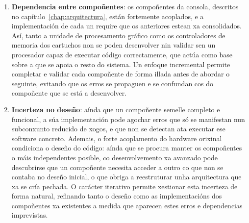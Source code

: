 \begin{enumerate}
    \item \textbf{Dependencia entre compoñentes}:
    os compoñentes da consola, descritos no capítulo~\ref{chap:arquitectura},
    están fortemente acoplados, e a implementación de cada un
    require que os anteriores estean xa consolidados.
    Así, tanto a unidade de procesamento gráfico como os controladores de memoria dos cartuchos
    non se poden desenvolver nin validar sen un procesador capaz de executar código correctamente,
    que actúa como base sobre a que se apoia o resto do sistema.
    Un enfoque incremental permite completar e validar cada compoñente de forma illada
    antes de abordar o seguinte, evitando que os erros se propaguen
    e se confundan cos do compoñente que se está a desenvolver.

    \item \textbf{Incerteza no deseño}:
    aínda que un compoñente semelle completo e funcional,
    a súa implementación pode agochar erros que só se manifestan
    nun subconxunto reducido de xogos, e que non se detectan
    ata executar ese software concreto.
    Ademais, o forte acoplamento do hardware orixinal condiciona o deseño do código:
    aínda que se procura manter os compoñentes o máis independentes posible,
    co desenvolvemento xa avanzado pode descubrirse que un compoñente necesita
    acceder a outro co que non se contaba no deseño inicial,
    o que obriga a reestruturar unha arquitectura que xa se cría pechada.
    O carácter iterativo permite xestionar esta incerteza de forma natural,
    refinando tanto o deseño como as implementacións dos compoñentes xa existentes
    a medida que aparecen estes erros e dependencias imprevistas.
\end{enumerate}


